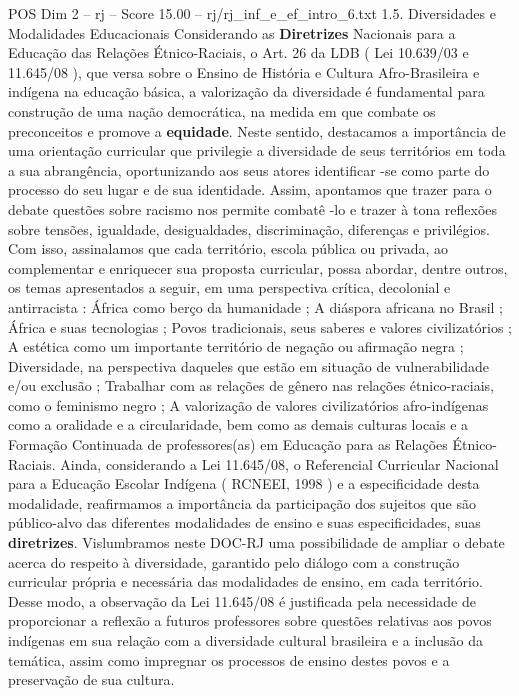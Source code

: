 \begin{textsample}{POS Dim 2 – rj – Score 15.00 – rj/rj\_inf\_e\_ef\_intro\_6.txt}  \label{ex:f2_pos_236}
1.5.
Diversidades e Modalidades Educacionais Considerando as \textbf{Diretrizes} Nacionais para a Educação das Relações Étnico-Raciais, o Art. 26 da LDB ( Lei 10.639/03 e 11.645/08 ), que versa sobre o Ensino de História e Cultura Afro-Brasileira e indígena na educação básica, a valorização da diversidade é fundamental para construção de uma nação democrática, na medida em que combate os preconceitos e promove a \textbf{equidade}.
Neste sentido, destacamos a importância de uma orientação curricular que privilegie a diversidade de seus territórios em toda a sua abrangência, oportunizando aos seus atores identificar -se como parte do processo do seu lugar e de sua identidade.
Assim, apontamos que trazer para o debate questões sobre racismo nos permite combatê -lo e trazer à tona reflexões sobre tensões, igualdade, desigualdades, discriminação, diferenças e privilégios.
Com isso, assinalamos que cada território, escola pública ou privada, ao complementar e enriquecer sua proposta curricular, possa abordar, dentre outros, os temas apresentados a seguir, em uma perspectiva crítica, decolonial e antirracista : África como berço da humanidade ; A diáspora africana no Brasil ; África e suas tecnologias ; Povos tradicionais, seus saberes e valores civilizatórios ; A estética como um importante território de negação ou afirmação negra ; Diversidade, na perspectiva daqueles que estão em situação de vulnerabilidade e/ou exclusão ; Trabalhar com as relações de gênero nas relações étnico-raciais, como o feminismo negro ; A valorização de valores civilizatórios afro-indígenas como a oralidade e a circularidade, bem como as demais culturas locais e a Formação Continuada de professores(as) em Educação para as Relações Étnico-Raciais.
Ainda, considerando a Lei 11.645/08, o Referencial Curricular Nacional para a Educação Escolar Indígena ( RCNEEI, 1998 ) e a especificidade desta modalidade, reafirmamos a importância da participação dos sujeitos que são público-alvo das diferentes modalidades de ensino e suas especificidades, suas \textbf{diretrizes}.
Vislumbramos neste DOC-RJ uma possibilidade de ampliar o debate acerca do respeito à diversidade, garantido pelo diálogo com a construção curricular própria e necessária das modalidades de ensino, em cada território.
Desse modo, a observação da Lei 11.645/08 é justificada pela necessidade de proporcionar a reflexão a futuros professores sobre questões relativas aos povos indígenas em sua relação com a diversidade cultural brasileira e a inclusão da temática, assim como impregnar os processos de ensino destes povos e a preservação de sua cultura.

\end{textsample}
